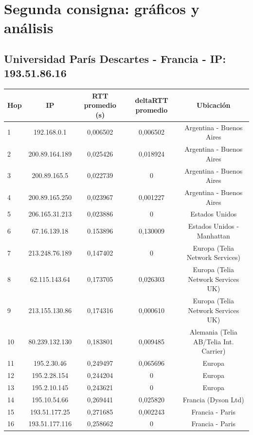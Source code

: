 \section{Segunda consigna: gráficos y análisis}

\subsection{Universidad París Descartes - Francia - IP: 193.51.86.16}

\bigskip

\begin{tabular}{ | l | c | c | c | c |}
 \hline                 
   Hop & IP &  RTT promedio (s)  & deltaRTT promedio & Ubicación\\
 \hline 
   1 & 192.168.0.1 & 0,006502 & 0,006502 & Argentina - Buenos Aires\\ 
 \hline 
   2 & 200.89.164.189 & 0,025426 & 0,018924 & Argentina - Buenos Aires\\ 
  \hline 
   3 & 200.89.165.5 & 0,022739 & 0 & Argentina - Buenos Aires\\ 
  \hline 
   4 & 200.89.165.250 & 0,023967 & 0,001227 & Argentina - Buenos Aires\\ 
  \hline 
   5 & 206.165.31.213 & 0,023886 & 0 & Estados Unidos\\ 
  \hline 
   6 & 67.16.139.18 & 0.153896 & 0,130009 & Estados Unidos - Manhattan\\ 
  \hline 
   7 & 213.248.76.189 & 0,147402 & 0 & Europa (Telia Network Services)\\ 
  \hline 
   8 & 62.115.143.64 & 0,173705 & 0,026303 & Europa (Telia Network Services UK)\\ 
  \hline 
   9 & 213.155.130.86 & 0,174316 & 0,000610 & Europa (Telia Network Services UK)\\ 
  \hline 
   10 & 80.239.132.130 & 0,183801 & 0,009485 & Alemania (Telia AB/Telia Int. Carrier)\\ 
  \hline 
   11 & 195.2.30.46 & 0,249497 & 0,065696 & Europa\\ 
  \hline 
   12 & 195.2.28.154 & 0,244204 & 0 & Europa\\ 
  \hline 
   13 & 195.2.10.145 & 0,243621 & 0 & Europa\\ 
  \hline 
   14 & 195.10.54.66 & 0,269441 & 0,025820 & Francia (Dyson Ltd)\\ 
  \hline 
   15 & 193.51.177.25 & 0,271685 & 0,002243 & Francia - Paris\\ 
  \hline 
   16 & 193.51.177.116 & 0,258662 & 0 & Francia - Paris\\ 

\end{tabular}

